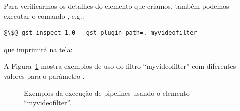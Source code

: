 Para verificarmos os detalhes do elemento que criamos, também podemos executar
o comando , e.g.: 
\begin{lstlisting}[style=command]
@\$@ gst-inspect-1.0 --gst-plugin-path=. myvideofilter
\end{lstlisting}
que imprimirá na tela:



\newpage

A Figura~\ref{fig:bunny_myvideofilter} mostra exemplos de uso do filtro
``myvideofilter'' com diferentes valores para o parâmetro .

\begin{figure}[H]
  \centering
  \caption{Exemplos da execução de pipelines usando o elemento
           ``myvideofilter''.}
  \label{fig:bunny_myvideofilter}
\end{figure}

